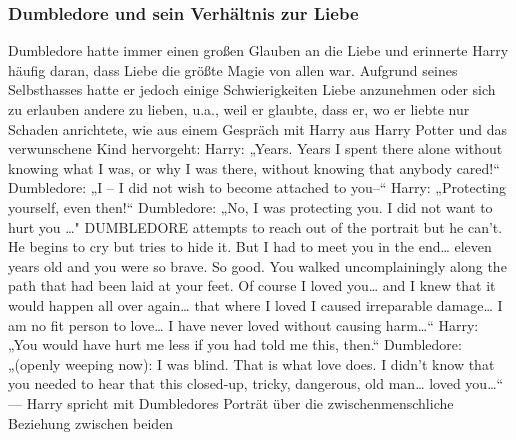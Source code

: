 \documentclass[a4paper, 10pt]{article}
\begin{document}
\subsubsection*{\large Dumbledore und sein Verhältnis zur Liebe}
Dumbledore hatte immer einen großen Glauben an die Liebe und erinnerte Harry häufig daran, dass Liebe die größte Magie von allen war. Aufgrund seines Selbsthasses hatte er jedoch einige Schwierigkeiten Liebe anzunehmen oder sich zu erlauben andere zu lieben, u.a., weil er glaubte, dass er, wo er liebte nur Schaden anrichtete, wie aus einem Gespräch mit Harry aus Harry Potter und das verwunschene Kind hervorgeht:
\vspace{10pt}
\newline
Harry: „Years. Years I spent there alone without knowing what I was, or why I was there, without knowing that anybody cared!“
\vspace{10pt}
\newline
Dumbledore: „I – I did not wish to become attached to you–“
\vspace{10pt}
\newline
Harry: „Protecting yourself, even then!“
\vspace{10pt}
\newline
Dumbledore: „No, I was protecting you. I did not want to hurt you …"
\vspace{10pt}
\newline
DUMBLEDORE attempts to reach out of the portrait but he can’t. He begins to cry but tries to hide it.
But I had to meet you in the end… eleven years old and you were so brave. So good. You walked uncomplainingly along the path that had been laid at your feet. Of course I loved you… and I knew that it would happen all over again… that where I loved I caused irreparable damage… I am no fit person to love… I have never loved without causing harm…“
\vspace{10pt}
\newline
Harry: „You would have hurt me less if you had told me this, then.“
\vspace{10pt}
\newline
Dumbledore: „(openly weeping now): I was blind. That is what love does. I didn’t know that you needed to hear that this closed-up, tricky, dangerous, old man… loved you…“
\vspace{10pt}
\newline
— Harry spricht mit Dumbledores Porträt über die zwischenmenschliche Beziehung zwischen beiden
\end{document}
